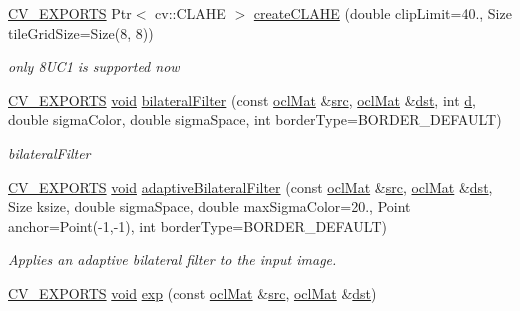 \begin{DoxyCompactItemize}
\hyperlink{core_2types__c_8h_a1bf9f0e121b54272da02379cfccd0a2b}{C\-V\-\_\-\-E\-X\-P\-O\-R\-T\-S} Ptr$<$ cv\-::\-C\-L\-A\-H\-E $>$ \hyperlink{namespacecv_1_1ocl_a205dedc13b6de1b6093d236f4c9eb742}{create\-C\-L\-A\-H\-E} (double clip\-Limit=40., Size tile\-Grid\-Size=Size(8, 8))
\begin{DoxyCompactList}\small\item\em only 8\-U\-C1 is supported now \end{DoxyCompactList}\item 
\hyperlink{core_2types__c_8h_a1bf9f0e121b54272da02379cfccd0a2b}{C\-V\-\_\-\-E\-X\-P\-O\-R\-T\-S} \hyperlink{legacy_8hpp_a8bb47f092d473522721002c86c13b94e}{void} \hyperlink{namespacecv_1_1ocl_a8b539f344eaa7ef0d27682506483b058}{bilateral\-Filter} (const \hyperlink{classcv_1_1ocl_1_1oclMat}{ocl\-Mat} \&\hyperlink{legacy_8hpp_a371cd109b74033bc4366f584edd3dacc}{src}, \hyperlink{classcv_1_1ocl_1_1oclMat}{ocl\-Mat} \&\hyperlink{photo__c_8h_aed13e2a25279b24dc954073233fef7a5}{dst}, int \hyperlink{legacy_8hpp_a6f364afbe132c4ecfea48bde1b0618ba}{d}, double sigma\-Color, double sigma\-Space, int border\-Type=B\-O\-R\-D\-E\-R\-\_\-\-D\-E\-F\-A\-U\-L\-T)
\begin{DoxyCompactList}\small\item\em bilateral\-Filter \end{DoxyCompactList}\item 
\hyperlink{core_2types__c_8h_a1bf9f0e121b54272da02379cfccd0a2b}{C\-V\-\_\-\-E\-X\-P\-O\-R\-T\-S} \hyperlink{legacy_8hpp_a8bb47f092d473522721002c86c13b94e}{void} \hyperlink{namespacecv_1_1ocl_a0f2569822a62943048f7c7675c7109ae}{adaptive\-Bilateral\-Filter} (const \hyperlink{classcv_1_1ocl_1_1oclMat}{ocl\-Mat} \&\hyperlink{legacy_8hpp_a371cd109b74033bc4366f584edd3dacc}{src}, \hyperlink{classcv_1_1ocl_1_1oclMat}{ocl\-Mat} \&\hyperlink{photo__c_8h_aed13e2a25279b24dc954073233fef7a5}{dst}, Size ksize, double sigma\-Space, double max\-Sigma\-Color=20., Point anchor=Point(-\/1,-\/1), int border\-Type=B\-O\-R\-D\-E\-R\-\_\-\-D\-E\-F\-A\-U\-L\-T)
\begin{DoxyCompactList}\small\item\em Applies an adaptive bilateral filter to the input image. \end{DoxyCompactList}\item 
\hyperlink{core_2types__c_8h_a1bf9f0e121b54272da02379cfccd0a2b}{C\-V\-\_\-\-E\-X\-P\-O\-R\-T\-S} \hyperlink{legacy_8hpp_a8bb47f092d473522721002c86c13b94e}{void} \hyperlink{namespacecv_1_1ocl_ae4fd648ef3b70e433fc273d33ed22c79}{exp} (const \hyperlink{classcv_1_1ocl_1_1oclMat}{ocl\-Mat} \&\hyperlink{legacy_8hpp_a371cd109b74033bc4366f584edd3dacc}{src}, \hyperlink{classcv_1_1ocl_1_1oclMat}{ocl\-Mat} \&\hyperlink{photo__c_8h_aed13e2a25279b24dc954073233fef7a5}{dst})

\end{DoxyCompactItemize}
